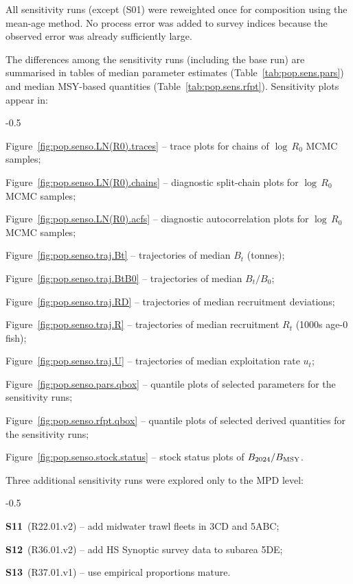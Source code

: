 \documentclass[11pt]{book}
\newcommand{\Bmsy}{B_\text{MSY}}
\begin{document}
All sensitivity runs (except (S01) were reweighted once for composition using the \citet{Francis:2011} mean-age method. 
No process error was added to survey indices because the observed error was already sufficiently large.

The differences among the sensitivity runs (including the base run) are summarised in tables of median parameter estimates (Table~\ref{tab:pop.sens.pars}) and median MSY-based quantities (Table~\ref{tab:pop.sens.rfpt}).
Sensitivity plots appear in:
\begin{itemize_csas}{-0.5}{}
  \item Figure~\ref{fig:pop.senso.LN(R0).traces} -- trace plots for chains of $\log\,R_0$ MCMC samples;
  \item Figure~\ref{fig:pop.senso.LN(R0).chains} -- diagnostic split-chain plots for $\log\,R_0$ MCMC samples;
  \item Figure~\ref{fig:pop.senso.LN(R0).acfs} -- diagnostic autocorrelation plots for $\log\,R_0$ MCMC samples;
  \item Figure~\ref{fig:pop.senso.traj.Bt} -- trajectories of median $B_t$ (tonnes);
  \item Figure~\ref{fig:pop.senso.traj.BtB0} -- trajectories of median $B_t/B_0$;
  \item Figure~\ref{fig:pop.senso.traj.RD} -- trajectories of median recruitment deviations;
  \item Figure~\ref{fig:pop.senso.traj.R} -- trajectories of median recruitment $R_t$ (1000s age-0 fish);
  \item Figure~\ref{fig:pop.senso.traj.U} -- trajectories of median exploitation rate $u_t$;
  \item Figure~\ref{fig:pop.senso.pars.qbox} -- quantile plots of selected parameters for the sensitivity runs;
  \item Figure~\ref{fig:pop.senso.rfpt.qbox} -- quantile plots of selected derived quantities for the sensitivity runs;
  \item Figure~\ref{fig:pop.senso.stock.status} -- stock status plots of $\Bcurr/\Bmsy$.
 \end{itemize_csas}

\medskip
Three additional sensitivity runs were explored only to the MPD level:
\begin{itemize_csas}{-0.5}{}
  \item \textbf{S11}~(R22.01.v2)  -- add midwater trawl fleets in 3CD and 5ABC;
  \item \textbf{S12}~(R36.01.v2)  -- add HS Synoptic survey data to subarea 5DE;
  \item \textbf{S13}~(R37.01.v1)  -- use empirical proportions mature.
\end{itemize_csas}
\end{document}
